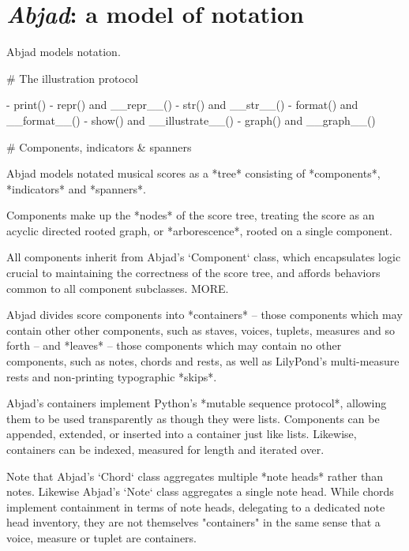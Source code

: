 \chapter{\emph{Abjad}: a model of notation}
\label{chap:a-model-of-notation}

\begin{markdown}

Abjad models notation.

# The illustration protocol

-   print()
-   repr() and __repr__()
-   str() and __str__()
-   format() and __format__()
-   show() and __illustrate__()
-   graph() and __graph__()

# Components, indicators & spanners

Abjad models notated musical scores as a *tree* consisting of *components*,
*indicators* and *spanners*.

Components make up the *nodes* of the score tree, treating the score as an
acyclic directed rooted graph, or *arborescence*, rooted on a single component.

All components inherit from Abjad's `Component` class, which encapsulates logic
crucial to maintaining the correctness of the score tree, and affords behaviors
common to all component subclasses. MORE.

Abjad divides score components into *containers* -- those components which may
contain other other components, such as staves, voices, tuplets, measures and
so forth -- and *leaves* -- those components which may contain no other
components, such as notes, chords and rests, as well as LilyPond's
multi-measure rests and non-printing typographic *skips*.

Abjad's containers implement Python's *mutable sequence protocol*, allowing
them to be used transparently as though they were lists. Components can be
appended, extended, or inserted into a container just like lists. Likewise,
containers can be indexed, measured for length and iterated over.

Note that Abjad's `Chord` class aggregates multiple *note heads* rather than
notes. Likewise Abjad's `Note` class aggregates a single note head. While
chords implement containment in terms of note heads, delegating to a dedicated
note head inventory, they are not themselves "containers" in the same sense
that a voice, measure or tuplet are containers.


\end{markdown}
